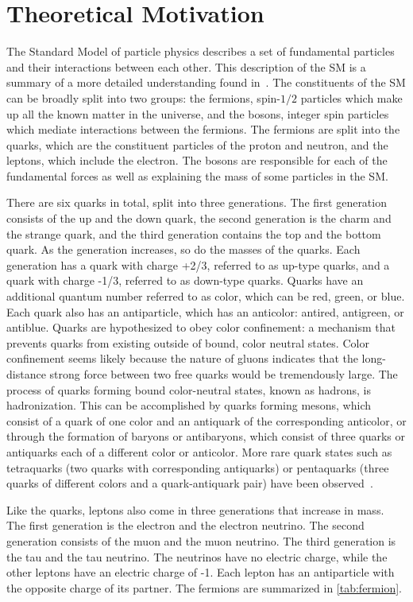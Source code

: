 \chapter{Theoretical Motivation}
\label{chap:theory}
The Standard Model of particle physics describes a set of fundamental particles and their interactions between each other. This description of the SM is a summary of a more detailed understanding found in~\cite{thomson:mpp}. The constituents of the SM can be broadly split into two groups: the fermions, spin-$1/2$ particles which make up all the known matter in the universe, and the bosons, integer spin particles which mediate interactions between the fermions. The fermions are split into the quarks, which are the constituent particles of the proton and neutron, and the leptons, which include the electron. The bosons are responsible for each of the fundamental forces as well as explaining the mass of some particles in the SM.

There are six quarks in total, split into three generations. The first generation consists of the up and the down quark, the second generation is the charm and the strange quark, and the third generation contains the top and the bottom quark. As the generation increases, so do the masses of the quarks. Each generation has a quark with charge +2/3, referred to as up-type quarks, and a quark with charge -1/3, referred to as down-type quarks. Quarks have an additional quantum number referred to as color, which can be red, green, or blue. Each quark also has an antiparticle, which has an anticolor: antired, antigreen, or antiblue. Quarks are hypothesized to obey color confinement: a mechanism that prevents quarks from existing outside of bound, color neutral states. Color confinement seems likely because the nature of gluons indicates that the long-distance strong force between two free quarks would be tremendously large. The process of quarks forming bound color-neutral states, known as hadrons, is hadronization. This can be accomplished by quarks forming mesons, which consist of a quark of one color and an antiquark of the corresponding anticolor, or through the formation of baryons or antibaryons, which consist of three quarks or antiquarks each of a different color or anticolor. More rare quark states such as tetraquarks (two quarks with corresponding antiquarks) or pentaquarks (three quarks of different colors and a quark-antiquark pair) have been observed~\cite{LHCb:2021ccus, LHCb:2019ccuud}.

Like the quarks, leptons also come in three generations that increase in mass. The first generation is the electron and the electron neutrino. The second generation consists of the muon and the muon neutrino. The third generation is the tau and the tau neutrino. The neutrinos have no electric charge, while the other leptons have an electric charge of -1. Each lepton has an antiparticle with the opposite charge of its partner. The fermions are summarized in \cref{tab:fermion}.

